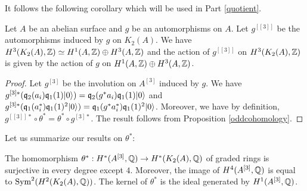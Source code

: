It follows the following corollary which will be used in Part \ref{quotient}.
\begin{cor}\label{actionH3}
Let $A$ be an abelian surface and $g$ be an automorphisms on $A$. Let $g^{[[3]]}$ be the automorphisms induced by $g$ on $K_2(A)$.
We have $H^3(K_2(A),\Z)\simeq H^1(A,\Z)\oplus H^3(A,\Z)$ and the action of $g^{[[3]]}$ on $H^3(K_2(A),\Z)$ is given by the action of $g$ on $H^1(A,\Z)\oplus H^3(A,\Z)$.
\end{cor}
\begin{proof}
Let $g^{[3]}$ be the involution on $A^{[3]}$ induced by $g$.
We have $g^{[3]*}(\q_2(a_i)\q_1(1)\vac)=\q_2(g^{*}a_i)\q_1(1)\vac$ and $g^{[3]*}(\q_1(a^*_i)\q_1(1)^2\vac)=\q_1(g^{*}a^*_i)\q_1(1)^2\vac$.
Moreover, we have by definition, $g^{[[3]]*}\circ \theta^{*}=\theta^{*}\circ g^{[3]*}$.
The result follows from Proposition \ref{oddcohomology}.
\end{proof}

Let us summarize our results on $\theta^*$:
\begin{theorem}\label{thetaTheorem}
The homomorphism $\theta^* : H^*(A\hilb{3},\Q)\rightarrow H^*(\kum{A}{2},\Q)$ of graded rings is surjective in every degree except $4$. Moreover, the image of $H^4(A\hilb{3},\Q)$ is equal to $\Sym^2(H^2(\kum{A}{2},\Q))$. 
The kernel of $\theta^*$ is the ideal generated by $H^1(A\hilb{3},\Q)$.
\end{theorem}
